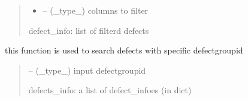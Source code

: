 \documentclass[letterpaper,10pt,english]{sphinxmanual}
\begin{document}
\begin{savenotes}
\begin{fulllineitems}
\begin{savenotes}
\begin{fulllineitems}
\begin{quote}
\begin{description}
\begin{itemize}
\item {} 
\sphinxAtStartPar
{} – (\_type\_) columns to filter

\end{itemize}

\sphinxAtStartPar
defect\_info: list of filterd defects

\end{description}\end{quote}

\end{fulllineitems}\end{savenotes}


\begin{savenotes}\begin{fulllineitems}
\label{\detokenize{setting/database_utils:oxin.database_utils.dataBaseUtils.search_defect_by_group_id}}
\pysigstartsignatures
{}
\pysigstopsignatures
\sphinxAtStartPar
this function is used to search defects with specific defect\sphinxhyphen{}group\sphinxhyphen{}id
\begin{quote}\begin{description}
\sphinxAtStartPar
{} – (\_type\_) input defect\sphinxhyphen{}group\sphinxhyphen{}id

\sphinxAtStartPar
defects\_info: a list of defect\_infoes (in dict)

\end{description}\end{quote}

\end{fulllineitems}\end{savenotes}



\end{fulllineitems}
\end{savenotes}
\end{document}
